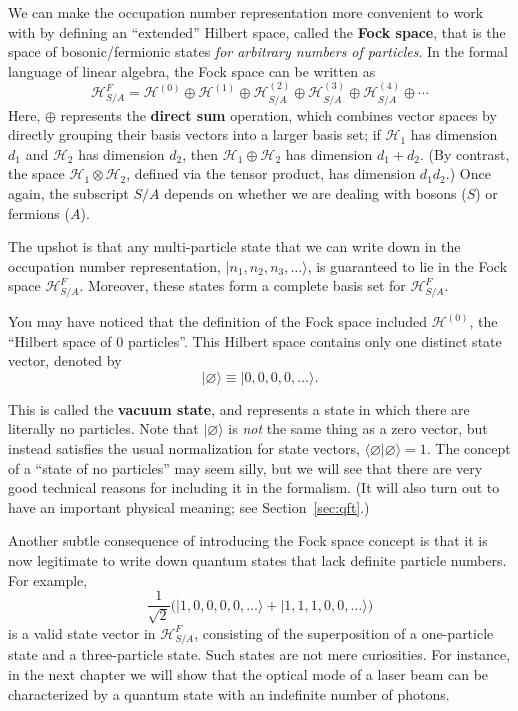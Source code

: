 \documentclass[pra,12pt]{revtex4}
\begin{document}
We can make the occupation number representation more convenient to
work with by defining an ``extended'' Hilbert space, called the
\textbf{Fock space}, that is the space of bosonic/fermionic states
\textit{for arbitrary numbers of particles}.  In the formal language
of linear algebra, the Fock space can be written as
$$\mathscr{H}_{S/A}^F = \mathscr{H}^{(0)} \oplus \mathscr{H}^{(1)} \oplus \mathscr{H}^{(2)}_{S/A} \oplus \mathscr{H}^{(3)}_{S/A} \oplus \mathscr{H}^{(4)}_{S/A} \oplus \cdots$$
Here, $\oplus$ represents the \textbf{direct sum} operation, which
combines vector spaces by directly grouping their basis vectors into a
larger basis set; if $\mathscr{H}_1$ has dimension $d_1$ and
$\mathscr{H}_2$ has dimension $d_2$, then
$\mathscr{H}_1\oplus\mathscr{H}_2$ has dimension $d_1+d_2$.  (By
contrast, the space $\mathscr{H}_1\otimes\mathscr{H}_2$, defined via
the tensor product, has dimension $d_1d_2$.)  Once again, the
subscript $S/A$ depends on whether we are dealing with bosons ($S$) or
fermions ($A$).

The upshot is that any multi-particle state that we can write down in
the occupation number representation, $|n_1,n_2,n_3,\dots\rangle$, is
guaranteed to lie in the Fock space $\mathscr{H}^{F}_{S/A}$.
Moreover, these states form a complete basis set for
$\mathscr{H}^{F}_{S/A}$.

You may have noticed that the definition of the Fock space included
$\mathscr{H}^{(0)}$, the ``Hilbert space of 0 particles''.  This
Hilbert space contains only one distinct state vector, denoted by
$$|\varnothing\rangle \equiv |0,0,0,0,\dots\rangle.$$

This is called the \textbf{vacuum state}, and represents a state in
which there are literally no particles.  Note that
$|\varnothing\rangle$ is \textit{not} the same thing as a zero vector,
but instead satisfies the usual normalization for state vectors,
$\langle\varnothing|\varnothing\rangle = 1$.  The concept of a ``state
of no particles'' may seem silly, but we will see that there are very
good technical reasons for including it in the formalism.  (It will
also turn out to have an important physical meaning; see
Section~\ref{sec:qft}.)

Another subtle consequence of introducing the Fock space concept is
that it is now legitimate to write down quantum states that lack
definite particle numbers.  For example,
$$\frac{1}{\sqrt{2}} \Big(|1,0,0,0,0,\dots\rangle + |1,1,1,0,0,\dots\rangle\Big)$$
is a valid state vector in $\mathscr{H}^{F}_{S/A}$, consisting of the
superposition of a one-particle state and a three-particle state.
Such states are not mere curiosities.  For instance, in the next
chapter we will show that the optical mode of a laser beam can be
characterized by a quantum state with an indefinite number of photons.
\end{document}

